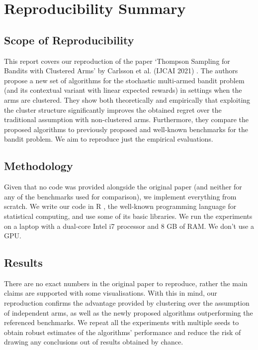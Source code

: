 \section*{\centering Reproducibility Summary}

\subsection*{Scope of Reproducibility}

This report covers our reproduction of the paper `Thompson Sampling for Bandits with Clustered Arms' by Carlsson et al. (IJCAI 2021) \cite{bandits}. The authors propose a new set of algorithms for the stochastic multi-armed bandit problem (and its contextual variant with linear expected rewards) in settings when the arms are clustered. They show both theoretically and empirically that exploiting the cluster structure significantly improves the obtained regret over the traditional assumption with non-clustered arms. Furthermore, they compare the proposed algorithms to previously proposed and well-known benchmarks for the bandit problem. We aim to reproduce just the empirical evaluations.

\subsection*{Methodology}

Given that no code was provided alongside the original paper (and neither for any of the benchmarks used for comparison), we implement everything from scratch. We write our code in R \cite{r}, the well-known programming language for statistical computing, and use some of its basic libraries. We run the experiments on a laptop with a dual-core Intel i7 processor and 8 GB of RAM. We don't use a GPU.

\subsection*{Results}

There are no exact numbers in the original paper to reproduce, rather the main claims are supported with some visualisations. With this in mind, our reproduction confirms the advantage provided by clustering over the assumption of independent arms, as well as the newly proposed algorithms outperforming the referenced benchmarks. We repeat all the experiments with multiple seeds to obtain robust estimates of the algorithms' performance and reduce the risk of drawing any conclusions out of results obtained by chance. 

